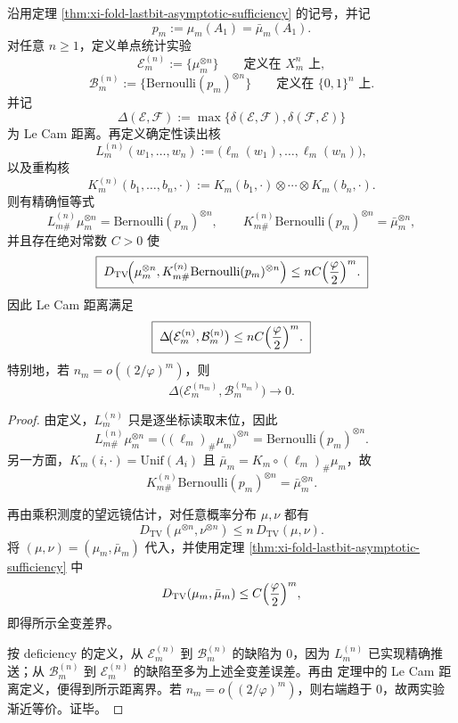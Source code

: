 \begin{theorem}\label{thm:xi-fold-lastbit-subcritical-sample-lecam-equivalence}
沿用定理 \ref{thm:xi-fold-lastbit-asymptotic-sufficiency} 的记号，并记
\[
p_m:=\mu_m(A_1)=\bar\mu_m(A_1).
\]
对任意 \(n\ge 1\)，定义单点统计实验
\[
\mathcal E_m^{(n)}:=\{\mu_m^{\otimes n}\}
\qquad\text{定义在 }X_m^n\text{ 上},
\]
\[
\mathcal B_m^{(n)}:=\{\mathrm{Bernoulli}(p_m)^{\otimes n}\}
\qquad\text{定义在 }\{0,1\}^n\text{ 上}.
\]
并记
\[
\Delta(\mathcal E,\mathcal F):=\max\{\delta(\mathcal E,\mathcal F),\delta(\mathcal F,\mathcal E)\}
\]
为 Le Cam 距离。再定义确定性读出核
\[
L_m^{(n)}(w_1,\dots,w_n):=\bigl(\ell_m(w_1),\dots,\ell_m(w_n)\bigr),
\]
以及重构核
\[
K_m^{(n)}(b_1,\dots,b_n,\cdot):=
K_m(b_1,\cdot)\otimes\cdots\otimes K_m(b_n,\cdot).
\]
则有精确恒等式
\[
L_{m\#}^{(n)}\mu_m^{\otimes n}
=
\mathrm{Bernoulli}(p_m)^{\otimes n},
\qquad
K_{m\#}^{(n)}\mathrm{Bernoulli}(p_m)^{\otimes n}
=
\bar\mu_m^{\otimes n},
\]
并且存在绝对常数 \(C>0\) 使
\[
\boxed{\;
D_{\mathrm{TV}}\!\Bigl(
\mu_m^{\otimes n},
K_{m\#}^{(n)}\mathrm{Bernoulli}(p_m)^{\otimes n}
\Bigr)
\le
nC\Bigl(\frac{\varphi}{2}\Bigr)^m.\;}
\]
因此 Le Cam 距离满足
\[
\boxed{\;
\Delta\!\bigl(\mathcal E_m^{(n)},\mathcal B_m^{(n)}\bigr)
\le
nC\Bigl(\frac{\varphi}{2}\Bigr)^m.\;}
\]
特别地，若 \(n_m=o((2/\varphi)^m)\)，则
\[
\boxed{\;
\Delta\!\bigl(\mathcal E_m^{(n_m)},\mathcal B_m^{(n_m)}\bigr)\longrightarrow 0.\;}
\]
\end{theorem}
\begin{proof}
由定义，\(L_m^{(n)}\) 只是逐坐标读取末位，因此
\[
L_{m\#}^{(n)}\mu_m^{\otimes n}
=
\bigl((\ell_m)_\#\mu_m\bigr)^{\otimes n}
=
\mathrm{Bernoulli}(p_m)^{\otimes n}.
\]
另一方面，\(K_m(i,\cdot)=\mathrm{Unif}(A_i)\) 且 \(\bar\mu_m=K_m\circ(\ell_m)_\#\mu_m\)，故
\[
K_{m\#}^{(n)}\mathrm{Bernoulli}(p_m)^{\otimes n}
=
\bar\mu_m^{\otimes n}.
\]

再由乘积测度的望远镜估计，对任意概率分布 \(\mu,\nu\) 都有
\[
D_{\mathrm{TV}}(\mu^{\otimes n},\nu^{\otimes n})
\le
n\,D_{\mathrm{TV}}(\mu,\nu).
\]
将 \((\mu,\nu)=(\mu_m,\bar\mu_m)\) 代入，并使用定理 \ref{thm:xi-fold-lastbit-asymptotic-sufficiency} 中
\[
D_{\mathrm{TV}}(\mu_m,\bar\mu_m)\le C\Bigl(\frac{\varphi}{2}\Bigr)^m,
\]
即得所示全变差界。

按 deficiency 的定义，从 \(\mathcal E_m^{(n)}\) 到 \(\mathcal B_m^{(n)}\) 的缺陷为 \(0\)，因为 \(L_m^{(n)}\) 已实现精确推送；从 \(\mathcal B_m^{(n)}\) 到 \(\mathcal E_m^{(n)}\) 的缺陷至多为上述全变差误差。再由
定理中的 Le Cam 距离定义，便得到所示距离界。若 \(n_m=o((2/\varphi)^m)\)，则右端趋于 \(0\)，故两实验渐近等价。证毕。
\end{proof}

